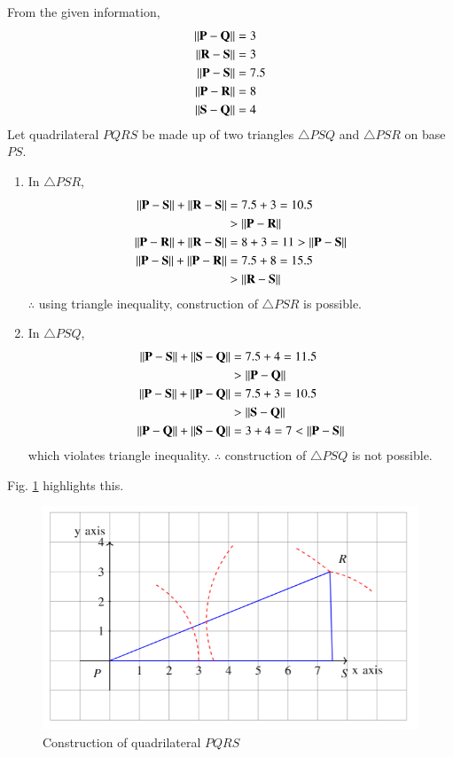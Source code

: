 From the given information, 
\begin{align}
    \left\lVert\mathbf{P}-\mathbf{Q}\right\rVert &= 3
    \\
    \left\lVert\mathbf{R}-\mathbf{S}\right\rVert &= 3
    \\
    \left\lVert\mathbf{P}-\mathbf{S}\right\rVert &= 7.5
    \\
    \left\lVert\mathbf{P}-\mathbf{R}\right\rVert &= 8
    \\
    \left\lVert\mathbf{S}-\mathbf{Q}\right\rVert &= 4
    \end{align}
    Let  quadrilateral $PQRS$ be made up of two triangles $\triangle PSQ$ and $\triangle PSR$ on base $PS$.
\begin{enumerate}
        
    \item In $\triangle PSR$,
    \begin{align}
    \left\lVert\mathbf{P}-\mathbf{S}\right\rVert + \left\lVert\mathbf{R}-\mathbf{S}\right\rVert &= 7.5 + 3  =10.5 \nonumber \\ &> \left\lVert\mathbf{P}-\mathbf{R}\right\rVert 
    \\
    \left\lVert\mathbf{P}-\mathbf{R}\right\rVert + \left\lVert\mathbf{R}-\mathbf{S}\right\rVert &= 8 + 3 =11 > \left\lVert\mathbf{P}-\mathbf{S}\right\rVert
    \\
    \left\lVert\mathbf{P}-\mathbf{S}\right\rVert + \left\lVert\mathbf{P}-\mathbf{R}\right\rVert &= 7.5 + 8 =15.5 \nonumber \\ & > \left\lVert\mathbf{R}-\mathbf{S}\right\rVert
    \end{align}
%
    $\therefore$ using triangle inequality, construction of $\triangle PSR$ is possible.

    \item In $\triangle PSQ$,
    \begin{align}
    \left\lVert\mathbf{P}-\mathbf{S}\right\rVert + \left\lVert\mathbf{S}-\mathbf{Q}\right\rVert &= 7.5 + 4 =11.5 \nonumber \\ &> \left\lVert\mathbf{P}-\mathbf{Q}\right\rVert 
    \\
    \left\lVert\mathbf{P}-\mathbf{S}\right\rVert + \left\lVert\mathbf{P}-\mathbf{Q}\right\rVert &= 7.5 + 3 =10.5 \nonumber \\ &> \left\lVert\mathbf{S}-\mathbf{Q}\right\rVert
    \\
    \left\lVert\mathbf{P}-\mathbf{Q}\right\rVert + \left\lVert\mathbf{S}-\mathbf{Q}\right\rVert &= 3 + 4 =7 < \left\lVert\mathbf{P}-\mathbf{S}\right\rVert
    \end{align}
which violates triangle inequality.   $\therefore$ construction of $\triangle PSQ$ is not possible.
    
  
\end{enumerate}

Fig. \ref{constr/32/fig:const_quadrilateral} highlights this.
%
\begin{figure}[!ht]
\centering
\includegraphics[width=\columnwidth]{solutions/32/Figure2.png}
\caption{Construction of quadrilateral $PQRS$}
\label{constr/32/fig:const_quadrilateral}	
\end{figure}


